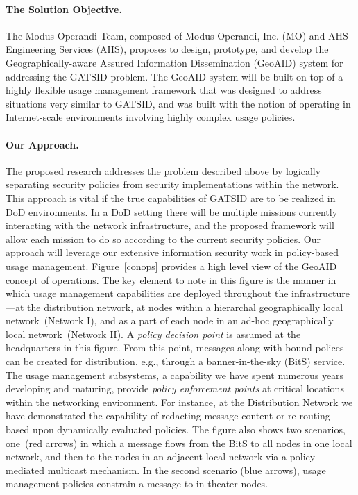 \documentclass{sbir}
\begin{document}
\clearpage
{}

\paragraph{The Solution Objective.} The Modus Operandi Team, composed of Modus Operandi, Inc. (MO) and AHS Engineering Services (AHS), proposes to design, prototype, and develop the Geographically-aware Assured Information Dissemination (GeoAID) system for addressing the GATSID problem. The GeoAID system will be built on top of a highly flexible usage management framework that was designed to address situations very similar to GATSID, and was built with the notion of operating in Internet-scale environments involving highly complex usage policies.

\paragraph{Our Approach.} The proposed research addresses the problem described above by logically separating security policies from security implementations within the network. This approach is vital if the true capabilities of GATSID are to be realized in DoD environments. In a DoD setting there will be multiple missions currently interacting with the network infrastructure, and the proposed framework will allow each mission to do so according to the current security policies. Our approach will leverage our extensive information security work in policy-based usage management. Figure~\ref{conops} provides a high level view of the GeoAID concept of operations. The key element to note in this figure is the manner in which usage management capabilities are deployed throughout the infrastructure---at the distribution network, at nodes within a hierarchal geographically local network~(Network I), and as a part of each node in an ad-hoc geographically local network~(Network II). A \emph{policy decision point} is assumed at the headquarters in this figure. From this point, messages along with bound polices can be created for distribution, e.g.,  through a banner-in-the-sky (BitS) service. The usage management subsystems, a capability we have spent numerous years developing and maturing, provide \emph{policy enforcement points} at critical locations within the networking environment. For instance, at the Distribution Network we have  demonstrated the capability of redacting message content or re-routing based upon dynamically evaluated policies. The figure also shows two scenarios, one~(red arrows) in which a message flows from the BitS to all nodes in one local network, and then to the nodes in an adjacent local network via a policy-mediated multicast mechanism. In the second scenario (blue arrows), usage management policies constrain a message to in-theater nodes.
\end{document}

